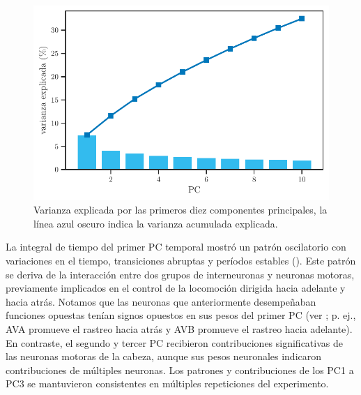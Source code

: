  \begin{figure}[h!]
	\centering\includegraphics[width=\imsize]{varianza_explicada_robot.pdf}
	\caption[Varianza explicada por las primeros diez componentes principales, la línea azul oscuro indica la varianza acumulada explicada.]{Varianza explicada por las primeros diez componentes principales, la línea azul oscuro indica la varianza acumulada explicada.}\label{fig:varianza}
\end{figure}


La integral de tiempo del primer PC temporal mostró un patrón oscilatorio con variaciones en el tiempo, transiciones abruptas y períodos estables (). Este patrón se deriva de la interacción entre dos grupos de interneuronas y neuronas motoras, previamente implicados en el control de la locomoción dirigida hacia adelante y hacia atrás. Notamos que las neuronas que anteriormente desempeñaban funciones opuestas tenían signos opuestos en sus pesos del primer PC (ver  ; p. ej., AVA promueve el rastreo hacia atrás y AVB promueve el rastreo hacia adelante). En contraste, el segundo y tercer PC recibieron contribuciones significativas de las neuronas motoras de la cabeza, aunque sus pesos neuronales indicaron contribuciones de múltiples neuronas. Los patrones y contribuciones de los PC1 a PC3 se mantuvieron consistentes en múltiples repeticiones del experimento.


